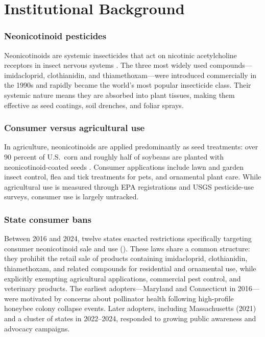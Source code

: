 \documentclass[12pt]{article}
\begin{document}
\section{Institutional Background}

\subsubsection*{Neonicotinoid pesticides} Neonicotinoids are systemic insecticides that act on nicotinic acetylcholine receptors in insect nervous systems \citep{jeschke2011overview}. The three most widely used compounds---imidacloprid, clothianidin, and thiamethoxam---were introduced commercially in the 1990s and rapidly became the world's most popular insecticide class. Their systemic nature means they are absorbed into plant tissues, making them effective as seed coatings, soil drenches, and foliar sprays.

\subsubsection*{Consumer versus agricultural use} In agriculture, neonicotinoids are applied predominantly as seed treatments: over 90 percent of U.S.\ corn and roughly half of soybeans are planted with neonicotinoid-coated seeds \citep{douglassamples2015}. Consumer applications include lawn and garden insect control, flea and tick treatments for pets, and ornamental plant care. While agricultural use is measured through EPA registrations and USGS pesticide-use surveys, consumer use is largely untracked.

\subsubsection*{State consumer bans} Between 2016 and 2024, twelve states enacted restrictions specifically targeting consumer neonicotinoid sale and use (). These laws share a common structure: they prohibit the retail sale of products containing imidacloprid, clothianidin, thiamethoxam, and related compounds for residential and ornamental use, while explicitly exempting agricultural applications, commercial pest control, and veterinary products. The earliest adopters---Maryland and Connecticut in 2016---were motivated by concerns about pollinator health following high-profile honeybee colony collapse events. Later adopters, including Massachusetts (2021) and a cluster of states in 2022--2024, responded to growing public awareness and advocacy campaigns.
\end{document}

